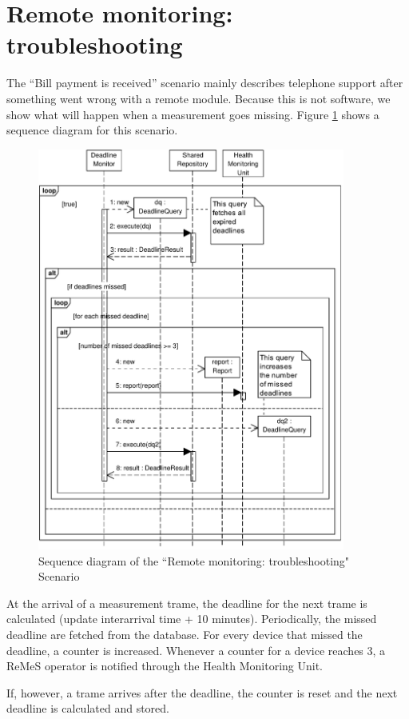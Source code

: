 \section{Remote monitoring: troubleshooting}
\label{scenario:rm-troubleshooting}

\npar The ``Bill payment is received'' scenario mainly describes telephone
support after something went wrong with a remote module. Because this is not
software, we show what will happen when a measurement goes missing. Figure
\ref{fig:scenario-5-3-3} shows a sequence diagram for this scenario.

\begin{figure}
	\begin{centering}
		\includegraphics[width=0.9\textwidth]{figs/scenario-5-3-3.pdf}
		\caption{Sequence diagram of the ``Remote monitoring: troubleshooting"
		Scenario}
		\label{fig:scenario-5-3-3}
	\end{centering}
\end{figure}

\npar At the arrival of a measurement trame, the deadline for the next trame is
calculated (update interarrival time + 10 minutes). Periodically, the
missed deadline are fetched from the database. For every device that missed the
deadline, a counter is increased. Whenever a counter for a device reaches 3, a
ReMeS operator is notified through the Health Monitoring Unit. 

\npar If, however, a trame arrives after the deadline, the counter is reset and
the next deadline is calculated and stored.
